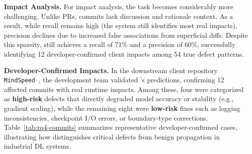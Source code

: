 

\noindent\textbf{Impact Analysis.}
For impact analysis, the task becomes considerably more challenging.
Unlike PRs, commits lack discussion and rationale context.
As a result, while recall remains high (the system still identifies most real impacts), precision declines due to increased false associations from superficial diffs.
Despite this sparsity, \appname still achieves a recall of 71\% and a precision of 60\%, successfully identifying 12 developer-confirmed client impacts among 54 true defect patterns.


\noindent\textbf{Developer-Confirmed Impacts.}
In the downstream client repository \texttt{MindSpeed}~\cite{mindspeed}, the development team validated \appname’s predictions, confirming 12 affected commits with real runtime impacts.
Among these, four were categorized as \textbf{high-risk} defects that directly degraded model accuracy or stability (e.g., gradient scaling), while the remaining eight were \textbf{low-risk} fixes such as logging inconsistencies, checkpoint I/O errors, or boundary-type corrections.
Table~\ref{tab:rq4-commits} summarizes representative developer-confirmed cases, illustrating how \appname distinguishes critical defects from benign propagation in industrial DL systems.


